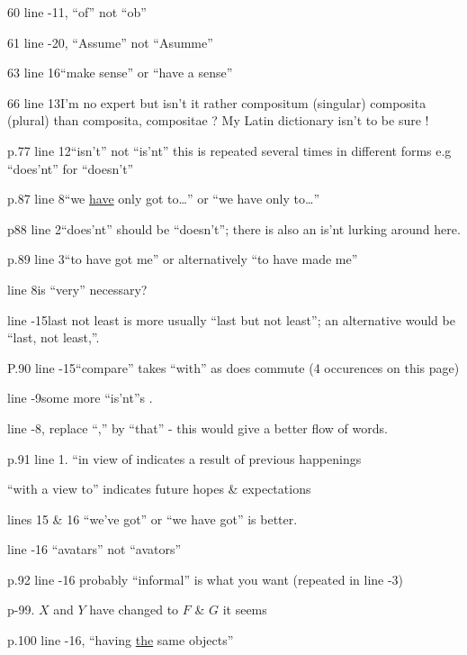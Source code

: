 60 line -11, ``of'' not ``ob''

61 line -20, ``Assume'' not ``Asumme''

63 line 16\quad ``make sense'' or ``have a sense''

66 line 13\quad I'm no  expert but isn't it rather compositum (singular) composita (plural) than composita, compositae ? My Latin dictionary isn't  to be sure !

p.77 line 12\quad ``isn't'' not ``is'nt'' this is repeated several times in different forms e.g ``does'nt'' for ``doesn't''

p.87 line 8\quad ``we \uline{have} only got to\ldots'' or ``we have only to\ldots''

p88 line 2\quad ``does'nt'' should be ``doesn't''; there is also an is'nt lurking around here.

p.89 line 3\quad ``to have got me'' or alternatively ``to have made me''

line 8\quad is ``very'' necessary?

line -15\quad {}last not least is more usually ``last but not least''; an alternative would be ``last, not least,''.

P.90 line -15\quad ``compare'' takes ``with'' as does commute (4 occurences on this page)

line -9\quad some more ``is'nt''s .

line -8, replace ``,'' by ``that'' - this would give a better flow of words.


p.91 line 1. ``in view of indicates a result of previous happenings

``with a view to'' indicates future hopes \& expectations

lines 15 \& 16 ``we've got'' or ``we have got'' is better.

line -16 ``avatars'' not ``avators''

p.92 line -16 probably ``informal'' is what you want (repeated in line -3)

p-99. $X$ and $Y$ have changed to $F$ \& $G$ it seems

p.100 line -16, ``having \uline{the} same objects''


